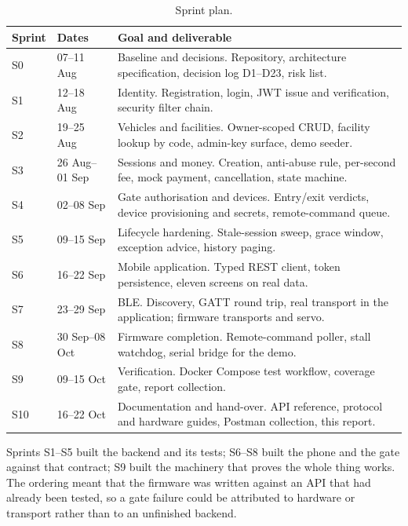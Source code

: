 \begin{table}[htbp]
  \centering
  \small
  \begin{tabularx}{\textwidth}{@{}llX@{}}
    \toprule
    \textbf{Sprint} & \textbf{Dates} & \textbf{Goal and deliverable} \\
    \midrule
    S0 & 07--11 Aug & Baseline and decisions. Repository, architecture
      specification, decision log D1--D23, risk list. \\
    S1 & 12--18 Aug & Identity. Registration, login, JWT issue and verification,
      security filter chain. \\
    S2 & 19--25 Aug & Vehicles and facilities. Owner-scoped CRUD, facility lookup by
      code, admin-key surface, demo seeder. \\
    S3 & 26 Aug--01 Sep & Sessions and money. Creation, anti-abuse rule, per-second
      fee, mock payment, cancellation, state machine. \\
    S4 & 02--08 Sep & Gate authorisation and devices. Entry/exit verdicts, device
      provisioning and secrets, remote-command queue. \\
    S5 & 09--15 Sep & Lifecycle hardening. Stale-session sweep, grace window,
      exception advice, history paging. \\
    S6 & 16--22 Sep & Mobile application. Typed REST client, token persistence,
      eleven screens on real data. \\
    S7 & 23--29 Sep & BLE. Discovery, GATT round trip, real transport in the
      application; firmware transports and servo. \\
    S8 & 30 Sep--08 Oct & Firmware completion. Remote-command poller, stall
      watchdog, serial bridge for the demo. \\
    S9 & 09--15 Oct & Verification. Docker Compose test workflow, coverage gate,
      report collection. \\
    S10 & 16--22 Oct & Documentation and hand-over. API reference, protocol and
      hardware guides, Postman collection, this report. \\
    \bottomrule
  \end{tabularx}
  \caption{Sprint plan.}
  \label{tab:sprints}
\end{table}


Sprints S1--S5 built the backend and its tests; S6--S8 built the phone and the gate
against that contract; S9 built the machinery that proves the whole thing works. The
ordering meant that the firmware was written against an API that had already been
tested, so a gate failure could be attributed to hardware or transport rather than
to an unfinished backend.

